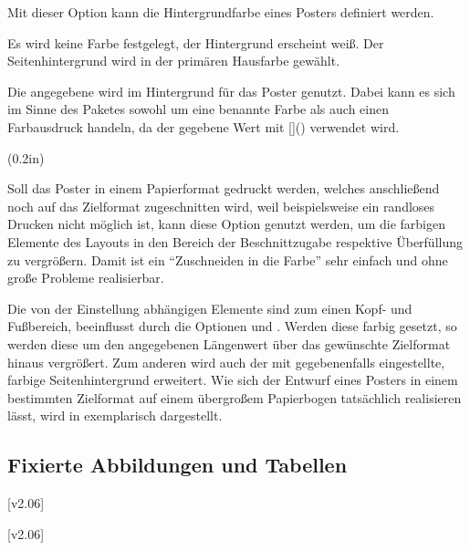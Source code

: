 \begin{DeclareEntity}{}
\begin{Declaration}
Mit dieser Option kann die Hintergrundfarbe eines Posters definiert werden.
%
\begin{values}{}
\itemfalse[nocolor]
  Es wird keine Farbe festgelegt, der Hintergrund erscheint weiß.
\itemtrue*[color]
  Der Seitenhintergrund wird in der primären Hausfarbe  gewählt.
\item[\PSet{Farbe}]
  Die angegebene  wird im Hintergrund für das Poster genutzt. 
  Dabei kann es sich im Sinne des Paketes  sowohl um eine 
  benannte Farbe als auch einen Farbausdruck handeln, da der gegebene Wert mit 
  []() verwendet wird.
\end{values}
\end{Declaration}

\begin{Declaration}
  {}
  (0.2in)

Soll das Poster in einem Papierformat gedruckt werden, welches anschließend 
noch auf das Zielformat zugeschnitten wird, weil beispielsweise ein randloses 
Drucken nicht möglich ist, kann diese Option genutzt werden, um die farbigen 
Elemente des Layouts in den Bereich der Beschnittzugabe respektive Überfüllung 
zu vergrößern. Damit ist ein \enquote{Zuschneiden in die Farbe} sehr einfach 
und ohne große Probleme realisierbar.

Die von der Einstellung  abhängigen 
Elemente sind zum einen Kopf- und Fußbereich, beeinflusst durch die Optionen 
 und . Werden diese farbig gesetzt, so werden 
diese um den angegebenen Längenwert über das gewünschte Zielformat hinaus 
vergrößert. Zum anderen wird auch der mit  gegebenenfalls 
eingestellte, farbige Seitenhintergrund erweitert. Wie sich der Entwurf eines 
Posters in einem bestimmten Zielformat auf einem übergroßem Papierbogen 
tatsächlich realisieren lässt, wird in  exemplarisch 
dargestellt.
\end{Declaration}



\subsection{Fixierte Abbildungen und Tabellen}

\begin{Declaration}
  {}
  [v2.06]
\begin{Declaration}
  {}
  [v2.06]
\printdeclarationlist[Gleitobjekte]


\end{Declaration}
\end{Declaration}
\end{DeclareEntity}
